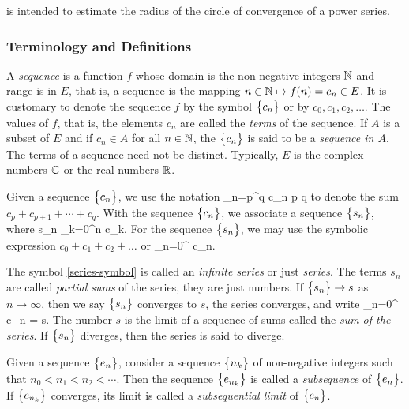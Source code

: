 \documentclass[12pt]{article}
\begin{document}
 is intended to estimate the radius of the circle of convergence of a power series.


\subsubsection{Terminology and  Definitions}\label{ssc:terminology-definitions}

A {\it sequence} is a function $f$ whose domain is the non-negative integers $\mathbb{N}$
and range is in $E$, that is, a sequence is the mapping $n \in \mathbb{N} \mapsto f(n) = c_n \in E$. It is customary
to denote the sequence $f$ by the symbol $\bigl\{ {c_n} \bigr\}$ or by $c_0, c_1, c_2, \ldots$.
The values of $f$, that is, the elements $c_n$ are called the {\it terms} of the sequence.
If $A$ is a subset of $E$ and if $c_n \in A$ for all $n \in \mathbb{N}$, the $\bigl\{ {c_n} \bigr\}$ is said to be
a {\it sequence in $A$}. The terms of a sequence need not be distinct. Typically, $E$ is
the complex numbers $\mathbb{C}$ or the real numbers $\mathbb{R}$.

Given a sequence $\bigl\{ {c_n} \bigr\}$, we use the notation
\EQ
{
  \sum_{n=p}^q c_n \qquad{}\qquad p \leq q
}
to denote the sum $c_p + c_{p+1} + \cdots + c_q$. With the sequence $\bigl\{ {c_n} \bigr\}$, we associate a sequence
$\bigl\{ {s_n} \bigr\}$, where
\EQ
{
  \label{eq:partial-sum}
  s_n  \sum_{k=0}^n c_k.
}
For the sequence $\bigl\{ {s_n} \bigr\}$, we may use the symbolic expression $c_0 + c_1 + c_2 + \ldots$ or
\EQ
{
  \label{eq:series-symbol}
  \sum_{n=0}^{\infty} c_n.
}

The symbol \eqref{series-symbol} is called an {\it infinite series} or just {\it series}. The
terms $s_n$ are called {\it partial sums} of the series, they are just numbers.
If $\bigl\{ {s_n} \bigr\} \rightarrow s$ as $n \rightarrow \infty$, then we say $\bigl\{ {s_n} \bigr\}$ converges to $s$,
the series converges, and write
\EQ
{
  \label{eq:series-limit}
  \sum_{n=0}^{\infty} c_n = s.
}
The number $s$ is the limit of a sequence of sums called the {\it sum of the series}. If $\bigl\{ {s_n} \bigr\}$
diverges, then the series is said to diverge.

Given a sequence $\bigl\{ {e_n} \bigr\}$, consider a sequence $\bigl\{ {n_k} \bigr\}$ of non-negative integers such that
$n_0 < n_1 < n_2 < \cdots$. Then the sequence $\bigl\{ {e_{n_k}} \bigr\}$ is called a {\it subsequence} of
$\bigl\{ {e_n} \bigr\}$. If $\bigl\{ {e_{n_k}} \bigr\}$ converges, its limit is called a {\it subsequential limit} of $\bigl\{ {e_n} \bigr\}$.
\end{document}
